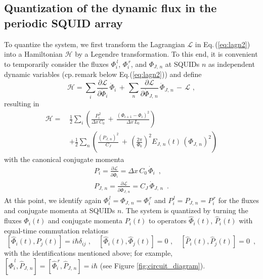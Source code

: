 \subsection{Quantization of the dynamic flux in the periodic SQUID array}
\noindent
To quantize the system, we first transform the Lagrangian $\mathcal{L}$ in Eq.\,(\ref{eq:lagn2})
into a Hamiltonian $\mathcal{H}$ by a Legendre transformation.
To this end, it is convenient to temporarily consider the fluxes $\Phi_i^{\,l}$, $\Phi_i^{\,r}$, and $\Phi_{J,\,n}$ 
at SQUIDs $n$ as independent dynamic variables (cp.\,remark below Eq.(\ref{eq:lagn2})) and define 
%
\begin{equation} \label{eq:ham1}
\mathcal{H} = \sum_{i} \frac{\partial\mathcal{L}}{\partial\dot{\Phi}_i} \, \dot{\Phi}_i 
\, + \, \sum_{n} \frac{\partial\mathcal{L}}{\partial\dot{\Phi}_{J,\,n}} \, \dot{\Phi}_{J,\,n}
\, - \, \mathcal{L} \, \, , 
\end{equation}
%
resulting in
%
\begin{equation} \label{eq:ham2}
\begin{split}
\mathcal{H} = \, & \frac{1}{2} \sum_i \left( \frac{P_i^{\,2}}{\Delta x \, C_{0}} \, + \, 
\frac{\left(\Phi_{i+1} - \Phi_{i}\right)^{2}}{\Delta x \, L_{0}} \right)  \\[2mm]
& + \frac{1}{2} \sum_n \left( \frac{\left(P_{J,\,n}\right)^2}{C_{J}} \, + \, 
 \left(\frac{2 \pi}{\Phi_0} \right)^2 E_{J,\,n}(t) \, \left( \Phi_{J,\,n} \right)^2 
\right)
\end{split}
\end{equation}
%
with the canonical conjugate momenta
%
\begin{subequations} \label{eq:mom}
\begin{eqnarray} 
P_i = \frac{\partial\mathcal{L}}{\partial\dot{\Phi}_i} = \Delta x \, C_0 \, \dot{\Phi}_i \label{eq:moma} \, \, \, , \\[2mm]
P_{J,\,n} = \frac{\partial\mathcal{L}}{\partial\dot{\Phi}_{J,\,n}} =  C_J \, \dot{\Phi}_{J,\,n} \, \, \,  . \label{eq:momb}
\end{eqnarray}
\end{subequations}
%
At this point, we identify again 
$\Phi_i^{\,l} = \Phi_{J,\,n} = \Phi_i^{\,r}$ and $P_i^{\,l} = P_{J,\,n} = P_i^{\,r}$
for the fluxes and conjugate momenta at SQUIDs $n$.
The system is quantized by turning the fluxes $\Phi_i(t)$ and conjugate momenta $P_i(t)$ 
to operators $\hat{\Phi}_i(t)$, $\hat{P}_i(t)$ with equal-time commutation relations
%
\begin{equation} \label{eq:cr} 
\left[\hat{\Phi}_i(t), \hat{P}_j(t) \right] = i \hbar \delta_{ij} \, \, , \quad 
\left[\hat{\Phi}_i(t), \hat{\Phi}_j(t) \right] = 0 \, \, , \quad 
\left[\hat{P}_i(t), \hat{P}_j(t) \right] = 0 \, \, \, , 
\end{equation}
%
with the identifications mentioned above; for example, 
$\left[\hat{\Phi}_i^{\,l}, \hat{P}_{J,\,n} \right] = 
\left[\hat{\Phi}_i^{\,r}, \hat{P}_{J,\,n} \right] = i \hbar$ (see Figure \ref{fig:circuit_diagram}).

